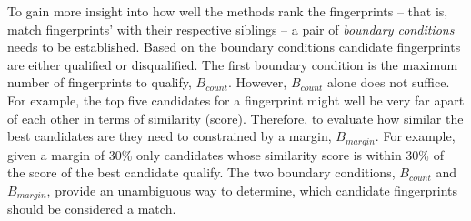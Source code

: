 \documentclass[thesis.tex]{subfiles}
\begin{document}
To gain more insight into how well the methods rank the fingerprints -- that is, match fingerprints' with their respective siblings -- a pair of \emph{boundary conditions} needs to be established. Based on the boundary conditions candidate fingerprints are either qualified or disqualified. The first boundary condition is the maximum number of fingerprints to qualify, $B_{count}$. However, $B_{count}$ alone does not suffice. For example, the top five candidates for a fingerprint might well be very far apart of each other in terms of similarity (score). Therefore, to evaluate how similar the best candidates are they need to constrained by a margin, $B_{margin}$. For example, given a margin of 30\% only candidates whose similarity score is within 30\% of the score of the best candidate qualify. The two boundary conditions, $B_{count}$ and $B_{margin}$, provide an unambiguous way to determine, which candidate fingerprints should be considered a match.

\clearpage
\end{document}
